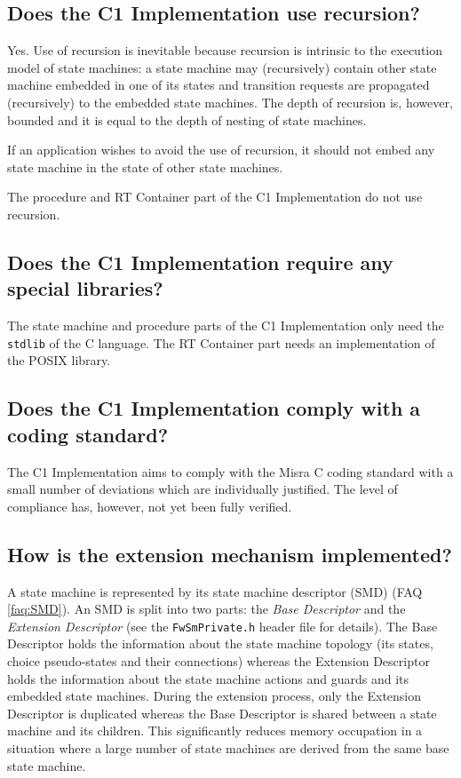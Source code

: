 \documentclass[a4paper,10pt]{article}
\begin{document}
\subsection{Does the C1 Implementation use recursion?}
Yes. Use of recursion is inevitable because recursion is intrinsic to the execution model of state machines: a state machine may (recursively) 
contain other state machine embedded in one of its states and transition requests are propagated (recursively) to the embedded state machines. 
The depth of recursion is, however, bounded and it is equal to the depth of nesting of state machines.

If an application wishes to avoid the use of recursion, it should not embed any state machine in the state of other state machines.  

The procedure and RT Container part of the C1 Implementation do not use recursion.

\subsection{Does the C1 Implementation require any special libraries?}
The state machine and procedure parts of the C1 Implementation only need the \texttt{stdlib} of the C language. The RT Container part needs an implementation of the POSIX library. 

\subsection{Does the C1 Implementation comply with a coding standard?}
The C1 Implementation aims to comply with the Misra C coding standard with a small number of deviations which are individually justified. 
The level of compliance has, however, not yet been fully verified.

\subsection{How is the extension mechanism implemented?}\label{faq:SM_Extension_Impl}
A state machine is represented by its state machine descriptor (SMD) (FAQ \ref{faq:SMD}). An SMD is split into two parts: the \emph{Base Descriptor} and 
the \emph{Extension Descriptor} (see the \texttt{FwSmPrivate.h} header file for details). The Base Descriptor holds the information about 
the state machine topology (its states, choice pseudo-states and their connections) whereas the Extension Descriptor holds the information 
about the state machine actions and guards and its embedded state machines. During the extension process, only the Extension Descriptor 
is duplicated whereas the Base Descriptor is shared between a state machine and its children. This significantly reduces memory occupation 
in a situation where a large number of state machines are derived from the same base state machine. 
\end{document}
